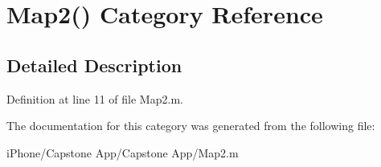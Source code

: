 \hypertarget{category_map2_07_08}{\section{Map2() Category Reference}
\label{category_map2_07_08}
}


\subsection{Detailed Description}


Definition at line 11 of file Map2.\-m.



The documentation for this category was generated from the following file\-:\begin{DoxyCompactItemize}
\item 
i\-Phone/\-Capstone App/\-Capstone App/Map2.\-m\end{DoxyCompactItemize}
